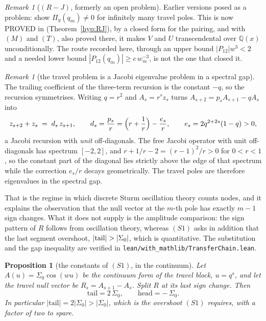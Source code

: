 \documentclass[11pt]{article}
\newtheorem{proposition}[theorem]{Proposition}
\theoremstyle{definition}
\theoremstyle{remark}
\newtheorem{remark}[theorem]{Remark}
\theoremstyle{definition}
\newcommand{\Q}{\mathbb{Q}}
\begin{document}
\begin{remark}[$(R\!-\!J)$, formerly an open problem]\label{prob:rj}
Earlier versions posed as a problem: show $\Pi_y(q_m)\ne0$ for infinitely many travel poles. This
is now PROVED in \cite{paper2} (Theorem~\ref{hyp:RJ}), by a closed form for the pairing, and with
$(M)$ and $(T)$, also proved there, it makes $V$ and $U$ transcendental over $\Q(x)$
unconditionally. The route recorded here, through an upper bound $|P_{12}|w^3<2$ and a needed
lower bound $|P_{12}(q_m)|\ge c\,w_m^{-3}$, is not the one that closed it.
\end{remark}

\begin{remark}[the travel problem is a Jacobi eigenvalue problem in a spectral gap]\label{rem:jacobi}
The trailing coefficient of the three-term recursion is the constant $-q$, so the recursion
symmetrises. Writing $q=r^2$ and $A_s=r^sz_s$ turns
$A_{s+2}=p_sA_{s+1}-qA_s$ into
\[
   z_{s+2}+z_s \;=\; d_s\,z_{s+1},\qquad
   d_s=\frac{p_s}{r}=\Bigl(r+\frac1r\Bigr)-\frac{e_s}{r},\qquad e_s=2q^{2+2s}(1-q)>0 ,
\]
a Jacobi recursion with \emph{unit} off-diagonals. The free Jacobi operator with unit
off-diagonals has spectrum $[-2,2]$, and $r+1/r-2=(r-1)^2/r>0$ for $0<r<1$, so the constant part
of the diagonal lies strictly above the edge of that spectrum while the correction $e_s/r$ decays
geometrically. The travel poles are therefore eigenvalues in the spectral gap.

That is the regime in which discrete Sturm oscillation theory counts nodes, and it explains the
observation that the null vector at the $m$-th pole has exactly $m-1$ sign changes. What it does
not supply is the amplitude comparison: the sign pattern of $R$ follows from oscillation theory,
whereas $(S1)$ asks in addition that the last segment overshoot, $|{\rm tail}|>|\Sigma_0|$, which
is quantitative. The substitution and the gap inequality are verified in
\texttt{lean/with\_mathlib/TransferChain.lean}.
\end{remark}

\begin{proposition}[the constants of $(S1)$, in the continuum]\label{prop:S1const}
Let $A(u)=\Sigma_0\cos(wu)$ be the continuum form of the travel block, $u=q^s$, and let the
travel null vector be $R_s=A_{s+1}-A_s$. Split $R$ at its last sign change. Then
\[
   \mathrm{tail}=2\,\Sigma_0,\qquad \mathrm{head}=-\,\Sigma_0 .
\]
In particular $|\mathrm{tail}|=2|\Sigma_0|>|\Sigma_0|$, which is the overshoot $(S1)$ requires,
with a factor of two to spare.
\end{proposition}
\end{document}
